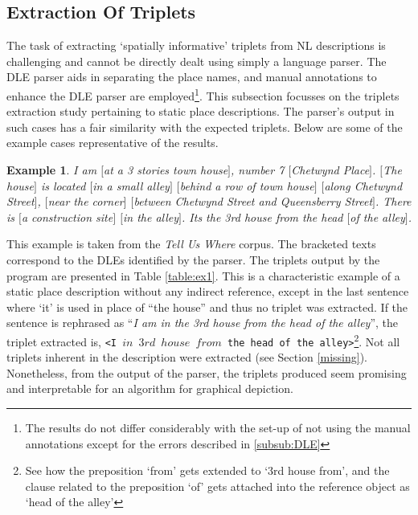 \documentclass{acm_proc_article-sp}
\begin{document}
\subsection{Extraction Of Triplets}
The task of extracting `spatially informative' triplets from NL descriptions is challenging and cannot be directly dealt using simply a language parser. The DLE parser aids in separating the place names, and manual annotations to enhance the DLE parser are employed\footnote{The results do not differ considerably with the set-up of not using the manual annotations except for the errors described in \ref{subsub:DLE}}. This subsection focusses on the triplets extraction study pertaining to static place descriptions. The parser's output in such cases has a fair similarity with the expected triplets. Below are some of the example cases representative of the results. 
\newtheorem{example}{Example}
\begin{example}
I am $[$at a 3 stories town house$]$, number 7 $[$Chetwynd Place$]$. $[$The house$]$ is located $[$in a small alley$]$ $[$behind a row of town house$]$ $[$along Chetwynd Street$]$, $[$near the corner$]$ $[$between Chetwynd Street and Queensberry Street$]$. There is $[$a construction site$]$ $[$in the alley$]$. Its the 3rd house from the head $[$of the alley$]$.
\end{example}
This example is taken from the \textit{Tell Us Where} corpus. The bracketed texts correspond to the DLEs identified by the parser. The triplets output by the program are presented in Table \ref{table:ex1}. This is a characteristic example of a static place description without any indirect reference, except in the last sentence where `it' is used in place of ``the house'' and thus no triplet was extracted. If the sentence is rephrased as ``\textit{I am in the 3rd house from the head of the alley}'', the triplet extracted is, \texttt{<I $in$ $3rd$ $house$ $from$ the head of the alley>}\footnote{See how the preposition `from' gets extended to `3rd house from', and the clause related to the preposition `of' gets attached into the reference object as `head of the alley'}. Not all triplets inherent in the description were extracted (see Section \ref{missing}). Nonetheless, from the output of the parser, the triplets produced seem promising and interpretable for an algorithm for graphical depiction. 
\end{document}
